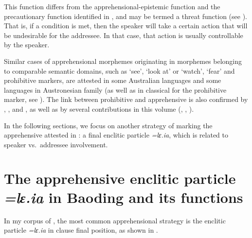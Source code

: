 \documentclass[output=paper,colorlinks,citecolor=brown, language=chinese]{langscibook}
\begin{document}
This function differs from the apprehensional-epistemic function and the precautionary function identified in \citet{lichtenberk1995}, and may be termed a threat function (see \cite[273]{vuillermet2018a}). That is, if a condition is met, then the speaker will take a certain action that will be undesirable for the addressee. In that case, that action is usually controllable by the speaker.

Similar cases of apprehensional morphemes originating in morphemes belonging to comparable semantic domains, such as `see', `look at' or `watch', `fear' and prohibitive markers, are attested in some Australian languages and some languages in Austronesian family (as well as in classical  for the prohibitive marker, see \cite{lichtenberk1995}). The link between prohibitive and apprehensive is also confirmed by \citet[50--63]{Dobrushina2006}, \citet{pakendorfschalley2007}, and \citet{smithdennis2021}, as well as by several contributions in this volume (\citeauthor{chapters/lahaussois}, \citeauthor{chapters/treis}, \citeauthor{chapters/wiemer}).

In the following sections, we focus on another strategy of marking the apprehensive attested in : a final enclitic particle \textit{=lɛ.ia}, which is related to speaker vs.\ addressee involvement.




\section{The apprehensive enclitic particle \textit{=lɛ.ia} in Baoding and its functions}
\label{sec:leia}

In my corpus of , the most common apprehensional strategy is the enclitic particle \textit{=lɛ.ia} in clause final position, as shown in .
\end{document}
